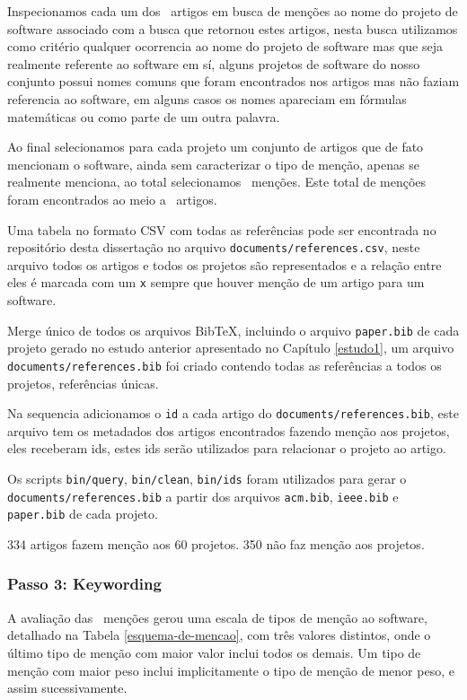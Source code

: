Inspecionamos cada um dos \SearchUniqueCount \ artigos em busca de menções ao
nome do projeto de software associado com a busca que retornou estes artigos,
nesta busca utilizamos como critério qualquer ocorrencia ao nome do projeto de
software mas que seja realmente referente ao software em sí, alguns projetos de
software do nosso conjunto possui nomes comuns que foram encontrados nos
artigos mas não faziam referencia ao software, em alguns casos os nomes
apareciam em fórmulas matemáticas ou como parte de um outra palavra.

Ao final selecionamos para cada projeto um conjunto de artigos que de fato
mencionam o software, ainda sem caracterizar o tipo de menção, apenas se
realmente menciona, ao total selecionamos \ScreeningCount \ menções.
Este total de menções foram encontrados ao meio a \ScreeningUniqueCount \ artigos.

Uma tabela no formato CSV com todas as referências pode ser encontrada no repositório
desta dissertação no arquivo \texttt{documents/references.csv}, neste arquivo todos
os artigos e todos os projetos são representados e a relação entre eles é marcada com
um \texttt{x} sempre que houver menção de um artigo para um software.

Merge único de todos os arquivos BibTeX, incluindo o arquivo \texttt{paper.bib} de
cada projeto gerado no estudo anterior apresentado no Capítulo \ref{estudo1}, um
arquivo \texttt{documents/references.bib} foi criado contendo todas as referências
a todos os projetos, referências únicas.

Na sequencia adicionamos o \texttt{id} a cada artigo do
\texttt{documents/references.bib}, este arquivo tem os metadados dos artigos
encontrados fazendo menção aos projetos, eles receberam ids, estes ids serão
utilizados para relacionar o projeto ao artigo.

Os scripts \texttt{bin/query}, \texttt{bin/clean}, \texttt{bin/ids} foram
utilizados para gerar o \texttt{documents/references.bib} a partir dos arquivos
\texttt{acm.bib}, \texttt{ieee.bib} e \texttt{paper.bib} de cada projeto.

334 artigos fazem menção aos 60 projetos.
350 não faz menção aos projetos.

\subsubsection{Passo 3: Keywording}

A avaliação das \ScreeningCount \ menções gerou uma escala de tipos de menção
ao software, detalhado na Tabela \ref{esquema-de-mencao}, com três valores
distintos, onde o último tipo de menção com maior valor inclui todos os demais.
Um tipo de menção com maior peso inclui implicitamente o tipo de menção de
menor peso, e assim sucessivamente.


